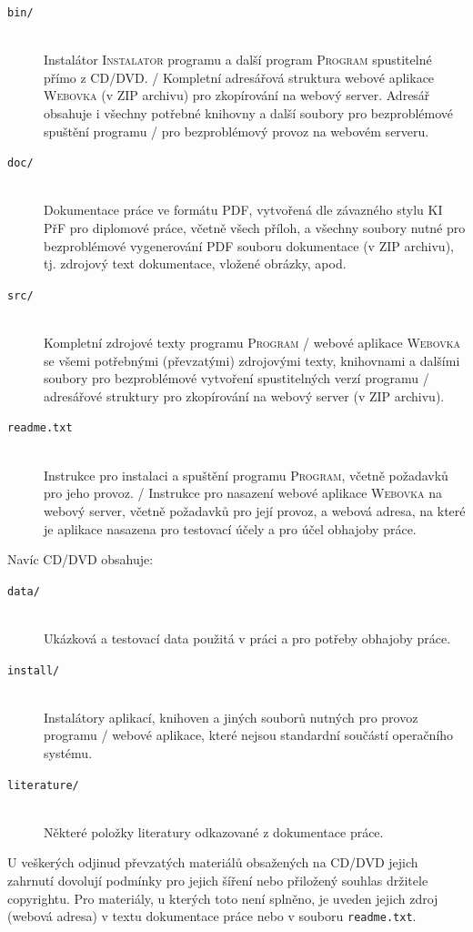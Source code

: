 \documentclass[12pt]{article}
\begin{document}
\begin{description}

\item[\texttt{bin/}] \hfill \\
Instalátor \textsc{Instalator} programu a další program
\textsc{Program} spustitelné přímo z CD/DVD. / Kompletní adresářová
struktura webové aplikace \textsc{Webovka} (v ZIP archivu) pro
zkopírování na webový server. Adresář obsahuje i všechny potřebné
knihovny a další soubory pro bezproblémové spuštění programu / pro
bezproblémový provoz na webovém serveru.

\item[\texttt{doc/}] \hfill \\
Dokumentace práce ve formátu PDF, vytvořená dle závazného stylu KI PřF
pro diplomové práce, včetně všech příloh, a všechny soubory nutné pro
bezproblémové vygenerování PDF souboru dokumentace (v ZIP archivu),
tj. zdrojový text dokumentace, vložené obrázky, apod.

\item[\texttt{src/}] \hfill \\
Kompletní zdrojové texty programu \textsc{Program} / webové aplikace
\textsc{Webovka} se všemi potřebnými (převzatými) zdrojovými texty,
knihovnami a dalšími soubory pro bezproblémové vytvoření spustitelných
verzí programu / adresářové struktury pro zkopírování na webový server
(v ZIP archivu).

\item[\texttt{readme.txt}] \hfill \\
Instrukce pro instalaci a spuštění programu \textsc{Program}, včetně
požadavků pro jeho provoz. / Instrukce pro nasazení webové aplikace
\textsc{Webovka} na webový server, včetně požadavků pro její provoz, a
webová adresa, na které je aplikace nasazena pro testovací účely a pro
účel obhajoby práce.

\end{description}

Navíc CD/DVD obsahuje:

\begin{description}

\item[\texttt{data/}] \hfill \\
Ukázková a testovací data použitá v práci a pro potřeby obhajoby
práce.

\item[\texttt{install/}] \hfill \\
Instalátory aplikací, knihoven a jiných souborů nutných pro provoz
programu / webové aplikace, které nejsou standardní součástí operačního
systému.

\item[\texttt{literature/}] \hfill \\
Některé položky literatury odkazované z dokumentace práce.

\end{description}

U veškerých odjinud převzatých materiálů obsažených na CD/DVD jejich
zahrnutí dovolují podmínky pro jejich šíření nebo přiložený souhlas
držitele copyrightu. Pro materiály, u kterých toto není splněno, je
uveden jejich zdroj (webová adresa) v textu dokumentace práce nebo v
souboru \texttt{readme.txt}.
\end{document}
